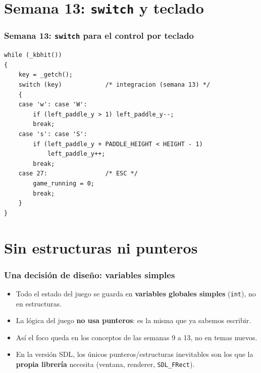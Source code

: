 \documentclass[]{beamer}
\begin{document}
\section{Semana 13: \texttt{switch} y teclado}
\begin{frame}[fragile]
  \frametitle{Semana 13: \texttt{switch} para el control por teclado}
  \lstset{style=myCStyle}
  \begin{lstlisting}
while (_kbhit())
{
    key = _getch();
    switch (key)            /* integracion (semana 13) */
    {
    case 'w': case 'W':
        if (left_paddle_y > 1) left_paddle_y--;
        break;
    case 's': case 'S':
        if (left_paddle_y + PADDLE_HEIGHT < HEIGHT - 1)
            left_paddle_y++;
        break;
    case 27:                /* ESC */
        game_running = 0;
        break;
    }
}
  \end{lstlisting}
\end{frame}

\section{Sin estructuras ni punteros}
\begin{frame}
  \frametitle{Una decisión de diseño: variables simples}
  \begin{itemize}
    \item Todo el estado del juego se guarda en \textbf{variables globales simples} (\texttt{int}), no en estructuras.
    \item La lógica del juego \textbf{no usa punteros}: es la misma que ya sabemos escribir.
    \item Así el foco queda en los conceptos de las semanas 9 a 13, no en temas nuevos.
    \item En la versión SDL, los únicos punteros/estructuras inevitables son los que la \textbf{propia librería} necesita (ventana, renderer, \texttt{SDL\_FRect}).
  \end{itemize}
\end{frame}
\end{document}
